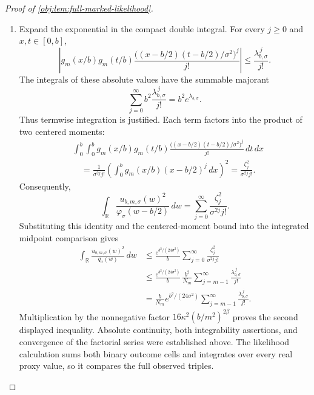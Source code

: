 \begin{proof}[Proof of \cref{obj:lem:full-marked-likelihood}]
\begin{enumerate}
\item Expand the exponential in the compact double integral. For every \(j\ge0\) and \(x,t\in[0,b]\),
\[
\left|
g_m(x/b)g_m(t/b)
\frac{\bigl((x-b/2)(t-b/2)/\sigma^2\bigr)^j}{j!}
\right|
\le\frac{\lambda_{b,\sigma}^{\,j}}{j!}.
\]
The integrals of these absolute values have the summable majorant
\[
\sum_{j=0}^{\infty}
b^2\frac{\lambda_{b,\sigma}^{\,j}}{j!}
=b^2e^{\lambda_{b,\sigma}}.
\]
Thus termwise integration is justified. Each term factors into the product of two centered moments:
\[
\begin{aligned}
&\int_0^b\int_0^b
g_m(x/b)g_m(t/b)
\frac{\bigl((x-b/2)(t-b/2)/\sigma^2\bigr)^j}{j!}\,dt\,dx\\
&\quad=
\frac1{\sigma^{2j}j!}
\left(\int_0^b g_m(x/b)(x-b/2)^j\,dx\right)^2
=\frac{\zeta_j^2}{\sigma^{2j}j!}.
\end{aligned}
\]
Consequently,
\[
\int_{\mathbb R}
\frac{u_{b,m,\sigma}(w)^2}{\varphi_\sigma(w-b/2)}\,dw
=
\sum_{j=0}^{\infty}\frac{\zeta_j^2}{\sigma^{2j}j!}.
\]
Substituting this identity and the centered-moment bound into the integrated midpoint comparison gives
\[
\begin{aligned}
\int_{\mathbb R}\frac{u_{b,m,\sigma}(w)^2}{q_\sigma(w)}\,dw
&\le
\frac{e^{b^2/(24\sigma^2)}}b
\sum_{j=0}^{\infty}\frac{\zeta_j^2}{\sigma^{2j}j!}\\
&\le
\frac{e^{b^2/(24\sigma^2)}}b\,
\frac{b^2}{N_m}
\sum_{j=m-1}^{\infty}\frac{\lambda_{b,\sigma}^{\,j}}{j!}\\
&=
\frac b{N_m}e^{b^2/(24\sigma^2)}
\sum_{j=m-1}^{\infty}\frac{\lambda_{b,\sigma}^{\,j}}{j!}.
\end{aligned}
\]
Multiplication by the nonnegative factor
\(16\kappa^2(b/m^2)^{2\beta}\) proves the second displayed inequality. Absolute continuity, both integrability assertions, and convergence of the factorial series were established above. The likelihood calculation sums both binary outcome cells and integrates over every real proxy value, so it compares the full observed triples.
\end{enumerate}
\end{proof}
